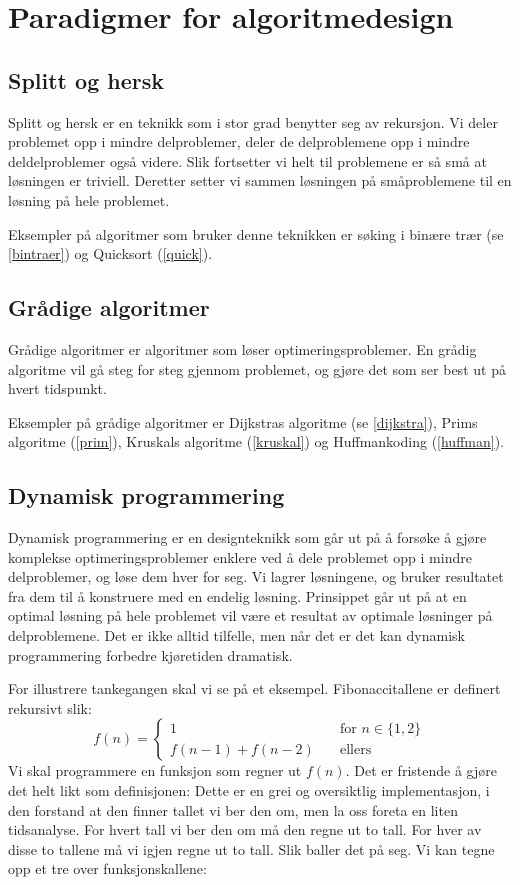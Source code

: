 \section{Paradigmer for algoritmedesign} \label{paradigmer}

\subsection{Splitt og hersk} \label{splitthersk}
Splitt og hersk er en teknikk som i stor grad benytter seg av rekursjon. Vi deler problemet opp i mindre delproblemer, deler de delproblemene opp i mindre deldelproblemer også videre. Slik fortsetter vi helt til problemene er så små at løsningen er triviell. Deretter setter vi sammen løsningen på småproblemene til en løsning på hele problemet. 

Eksempler på algoritmer som bruker denne teknikken er søking i binære trær (se \ref{bintraer}) og Quicksort (\ref{quick}).


\subsection{Grådige algoritmer}
Grådige algoritmer er algoritmer som løser optimeringsproblemer. En grådig algoritme vil gå steg for steg gjennom problemet, og gjøre det som ser best ut på hvert tidspunkt.

Eksempler på grådige algoritmer er Dijkstras algoritme (se \ref{dijkstra}), Prims algoritme (\ref{prim}), Kruskals algoritme (\ref{kruskal}) og Huffmankoding (\ref{huffman}).



\subsection{Dynamisk programmering}
Dynamisk programmering er en designteknikk som går ut på å forsøke å gjøre komplekse optimeringsproblemer enklere ved å dele problemet opp i mindre delproblemer, og løse dem hver for seg. Vi lagrer løsningene, og bruker resultatet fra dem til å konstruere med en endelig løsning. Prinsippet går ut på at en optimal løsning på hele problemet vil være et resultat av optimale løsninger på delproblemene. Det er ikke alltid tilfelle, men når det er det kan dynamisk programmering forbedre kjøretiden dramatisk.

For illustrere tankegangen skal vi se på et eksempel. Fibonaccitallene er definert rekursivt slik:
\[ f(n) =	\left\{
	\begin{array}{ll}
		1 \quad& \text{for } n \in \{1, 2\} \\
		f(n-1) + f(n-2) \quad& \text{ellers} 
	\end{array}
	\right. \]
Vi skal programmere en funksjon som regner ut $ f(n) $. Det er fristende å gjøre det helt likt som definisjonen:
Dette er en grei og oversiktlig implementasjon, i den forstand at den finner tallet vi ber den om, men la oss foreta en liten tidsanalyse. For hvert tall vi ber den om må den regne ut to tall. For hver av disse to tallene må vi igjen regne ut to tall. Slik baller det på seg. Vi kan tegne opp et tre over funksjonskallene:

